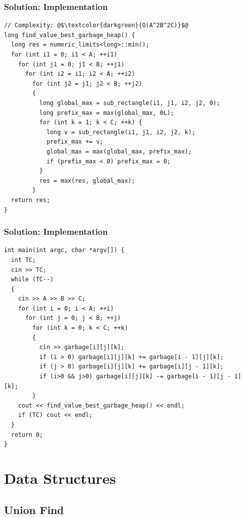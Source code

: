 \documentclass{beamer}
\begin{document}
\begin{frame}[containsverbatim]
\frametitle{Solution: Implementation}

\scriptsize
\begin{lstlisting}
// Complexity: @$\textcolor{darkgreen}{O(A^2B^2C)}$@
long find_value_best_garbage_heap() {
  long res = numeric_limits<long>::min();
  for (int i1 = 0; i1 < A; ++i1)
    for (int j1 = 0; j1 < B; ++j1)
      for (int i2 = i1; i2 < A; ++i2)
        for (int j2 = j1; j2 < B; ++j2)
        {
          long global_max = sub_rectangle(i1, j1, i2, j2, 0);
          long prefix_max = max(global_max, 0L);
          for (int k = 1; k < C; ++k) {
            long v = sub_rectangle(i1, j1, i2, j2, k);
            prefix_max += v;
            global_max = max(global_max, prefix_max);
            if (prefix_max < 0) prefix_max = 0;
          }
          res = max(res, global_max);
        }
  return res;
}
\end{lstlisting}

\end{frame}

\begin{frame}[containsverbatim]
\frametitle{Solution: Implementation}

\scriptsize
\begin{lstlisting}
int main(int argc, char *argv[]) {
  int TC;
  cin >> TC;
  while (TC--)
  {
    cin >> A >> B >> C;
    for (int i = 0; i < A; ++i)
      for (int j = 0; j < B; ++j)
        for (int k = 0; k < C; ++k)
        {
          cin >> garbage[i][j][k];
          if (i > 0) garbage[i][j][k] += garbage[i - 1][j][k];
          if (j > 0) garbage[i][j][k] += garbage[i][j - 1][k];
          if (i>0 && j>0) garbage[i][j][k] -= garbage[i - 1][j - 1][k];
        }
    cout << find_value_best_garbage_heap() << endl;
    if (TC) cout << endl;
  }
  return 0;
}
\end{lstlisting}

\end{frame}

\fi


\section{Data Structures}

\subsection{Union Find}
\end{document}
